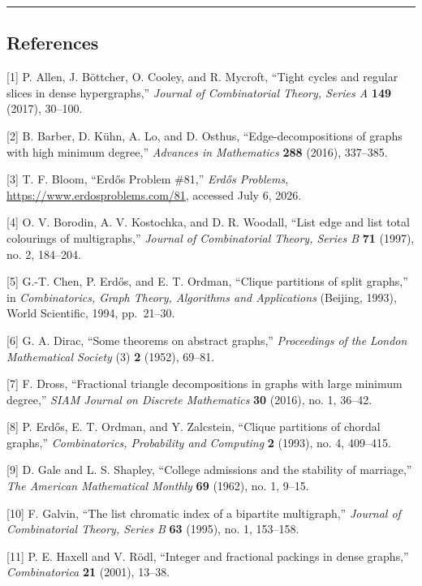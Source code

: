 \documentclass[english,11pt,a4paper]{article}
\begin{document}
\begin{center}\rule{0.5\linewidth}{0.5pt}\end{center}

\subsection{References}\label{references}

{[}1{]} P. Allen, J. Böttcher, O. Cooley, and R. Mycroft, ``Tight cycles
and regular slices in dense hypergraphs,'' \emph{Journal of
Combinatorial Theory, Series A} \textbf{149} (2017), 30--100.

{[}2{]} B. Barber, D. Kühn, A. Lo, and D. Osthus, ``Edge-decompositions
of graphs with high minimum degree,'' \emph{Advances in Mathematics}
\textbf{288} (2016), 337--385.

{[}3{]} T. F. Bloom, ``Erdős Problem \#81,'' \emph{Erdős Problems},
\url{https://www.erdosproblems.com/81}, accessed July 6, 2026.

{[}4{]} O. V. Borodin, A. V. Kostochka, and D. R. Woodall, ``List edge
and list total colourings of multigraphs,'' \emph{Journal of
Combinatorial Theory, Series B} \textbf{71} (1997), no. 2, 184--204.

{[}5{]} G.-T. Chen, P. Erdős, and E. T. Ordman, ``Clique partitions of
split graphs,'' in \emph{Combinatorics, Graph Theory, Algorithms and
Applications} (Beijing, 1993), World Scientific, 1994, pp.~21--30.

{[}6{]} G. A. Dirac, ``Some theorems on abstract graphs,''
\emph{Proceedings of the London Mathematical Society} (3) \textbf{2}
(1952), 69--81.

{[}7{]} F. Dross, ``Fractional triangle decompositions in graphs with
large minimum degree,'' \emph{SIAM Journal on Discrete Mathematics}
\textbf{30} (2016), no. 1, 36--42.

{[}8{]} P. Erdős, E. T. Ordman, and Y. Zalcstein, ``Clique partitions of
chordal graphs,'' \emph{Combinatorics, Probability and Computing}
\textbf{2} (1993), no. 4, 409--415.

{[}9{]} D. Gale and L. S. Shapley, ``College admissions and the
stability of marriage,'' \emph{The American Mathematical Monthly}
\textbf{69} (1962), no. 1, 9--15.

{[}10{]} F. Galvin, ``The list chromatic index of a bipartite
multigraph,'' \emph{Journal of Combinatorial Theory, Series B}
\textbf{63} (1995), no. 1, 153--158.

{[}11{]} P. E. Haxell and V. Rödl, ``Integer and fractional packings in
dense graphs,'' \emph{Combinatorica} \textbf{21} (2001), 13--38.
\end{document}
